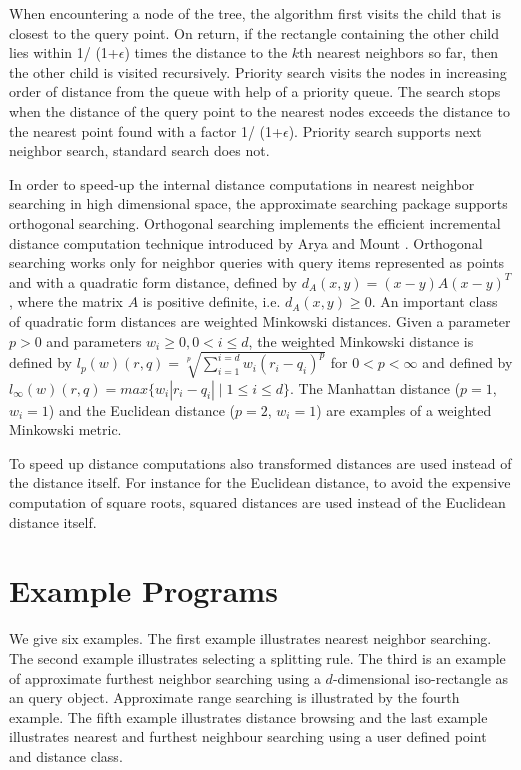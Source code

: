 When encountering a node of the tree, the algorithm first visits the child that is closest
to the query point. On return, if the rectangle containing  the other child lies within
1/ (1+$\epsilon$) times the distance to the $k$th nearest neighbors so far, then
the other child is visited recursively.
Priority search \cite{am-annqf-93} visits the nodes in increasing order of distance from
the queue with help of a priority queue.
The search stops when the distance of the query point to the nearest nodes
exceeds the distance to the nearest point found with a factor 1/ (1+$\epsilon$).
Priority search supports next neighbor search, standard search does not.

In order to speed-up the internal distance computations in nearest neighbor searching
in high dimensional space, the approximate searching package supports orthogonal searching. Orthogonal
searching implements the efficient incremental distance computation
technique introduced by Arya and Mount \cite{am-afvq-93}.
Orthogonal searching works only for neighbor queries with query items represented as
points and with a quadratic form distance, defined by $d_A(x,y)= (x-y)A(x-y)^T$, where the matrix
$A$ is positive definite, i.e. $d_A(x,y) \geq 0$. 
An important class of quadratic form distances are weighted Minkowski distances.
Given a parameter $p>0$ and parameters $w_i \geq 0, 0 < i \leq d$, the weighted 
Minkowski distance is defined by  $l_p(w)(r,q)=\sqrt[p] {\sum_{i=1}^{i=d} w_i(r_i-q_i)^p}$ for $0 < p <\infty$ and
defined by $l_{\infty}(w)(r,q)=max \{w_i |r_i-q_i| \mid 1 \leq i \leq d\}$.
The Manhattan distance ($p=1$, $w_i=1$) and the
Euclidean distance ($p=2$, $w_i=1$) are examples of a weighted Minkowski metric.

To speed up distance computations also transformed
distances are used instead of the distance itself. 
For instance for the Euclidean distance, to avoid the expensive computation
of square roots, squared distances are used instead of the Euclidean distance itself. 


\section{Example Programs}

We give six examples. 
The first example illustrates nearest neighbor searching.
The second example illustrates selecting a splitting rule.
The third is an example of approximate furthest neighbor searching using a $d$-dimensional
iso-rectangle as an query object.
Approximate range
searching is illustrated by the fourth example.
The fifth example illustrates distance browsing and the last example illustrates 
nearest and furthest neighbour searching using
a user defined point and distance class.

